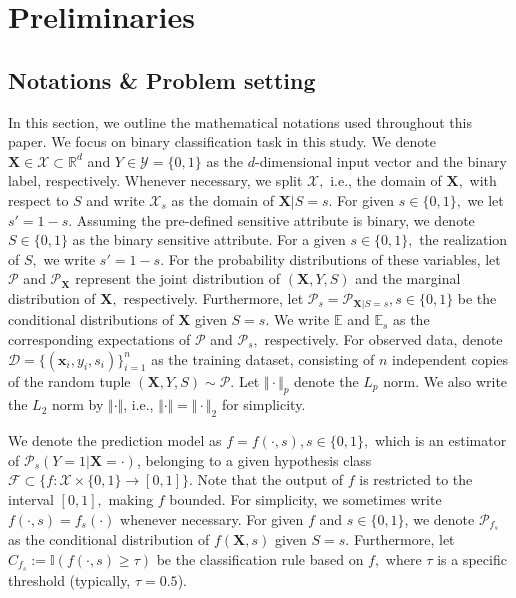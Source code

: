 \documentclass[10pt]{article} %
\begin{document}
\section{Preliminaries}\label{sec:pre}

\subsection{Notations \& Problem setting}\label{sec:notation}

In this section, we outline the mathematical notations used throughout this paper.
We focus on binary classification task in this study.
We denote $\mathbf{X} \in \mathcal{X} \subset \mathbb{R}^{d}$ and $Y \in \mathcal{Y} = \{ 0, 1 \}$ as the $d$-dimensional input vector and the binary label, respectively.
Whenever necessary, we split $\mathcal{X},$ i.e., the domain of $\mathbf{X},$ with respect to $S$ and write $\mathcal{X}_{s}$ as the domain of $\mathbf{X} | S = s.$
For given $s\in \{0,1\},$ we let $s'=1-s.$
Assuming the pre-defined sensitive attribute is binary, we denote $S \in \{ 0, 1 \}$ as the binary sensitive attribute.
For a given $s \in \{ 0, 1 \},$ the realization of $S,$ we write $s' = 1 - s.$
For the probability distributions of these variables, let $\mathcal{P}$ and $\mathcal{P}_{\mathbf{X}}$ represent the joint distribution of $(\mathbf{X}, Y, S)$ and the marginal distribution of $\mathbf{X},$ respectively.
Furthermore, let $\mathcal{P}_{s} = \mathcal{P}_{\mathbf{X} | S=s}, s\in \{0,1\}$ be the conditional distributions of $\mathbf{X}$ given $S = s.$ 
We write $\mathbb{E}$ and $\mathbb{E}_{s}$ as the corresponding expectations of $\mathcal{P}$ and $\mathcal{P}_{s},$ respectively.
For observed data, denote $\mathcal{D} = \{(\mathbf{x}_i, y_i, s_i)\}_{i=1}^n$ as the training dataset, consisting of $n$ independent copies of the random tuple $(\mathbf{X}, Y, S) \sim \mathcal{P}.$
Let $\Vert \cdot \Vert_{p}$ denote the $L_{p}$ norm.
We also write the $L_{2}$ norm by $\Vert \cdot \Vert$, i.e., $\Vert \cdot \Vert = \Vert \cdot \Vert_{2}$ for simplicity.

We denote the prediction model as $f = f(\cdot, s), s \in \{ 0, 1 \},$ which is an estimator of $\mathcal{P}_{s}(Y = 1 | \mathbf{X} = \cdot)$, belonging to a given hypothesis class $\mathcal{F} \subset \{ f:\mathcal{X} \times \{ 0, 1 \} \rightarrow [0, 1] \}.$
Note that the output of $f$ is restricted to the interval $[0, 1],$ making $f$ bounded.
For simplicity, we sometimes write $f(\cdot, s) = f_{s}(\cdot)$ whenever necessary.
For given $f$ and $s \in \{0, 1\}$, we denote $\mathcal{P}_{f_{s}}$ as the conditional distribution of $f(\bm{X},s)$ given $S=s$.
Furthermore, let $C_{f_{s}} := \mathbb{I} (f(\cdot, s) \ge \tau)$ be the classification rule based on $f,$ where $\tau$ is a specific threshold (typically, $\tau = 0.5$).
\end{document}
